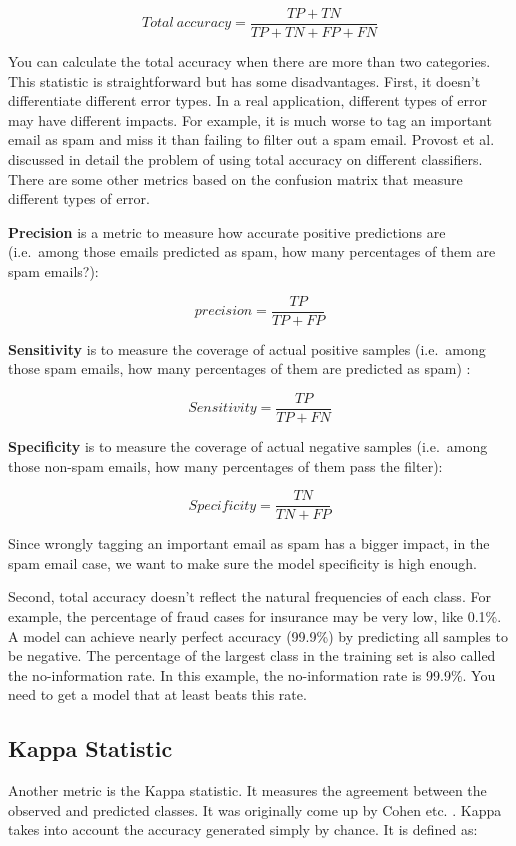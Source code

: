 \documentclass[12pt,]{krantz}
\begin{document}
\[Total\ accuracy = \frac{TP+TN}{TP+TN+FP+FN}\]

You can calculate the total accuracy when there are more than two categories. This statistic is straightforward but has some disadvantages. First, it doesn't differentiate different error types. In a real application, different types of error may have different impacts. For example, it is much worse to tag an important email as spam and miss it than failing to filter out a spam email. Provost et al. \citep{Provost1998} discussed in detail the problem of using total accuracy on different classifiers. There are some other metrics based on the confusion matrix that measure different types of error.

\textbf{Precision} is a metric to measure how accurate positive predictions are (i.e.~among those emails predicted as spam, how many percentages of them are spam emails?):

\[precision = \frac{TP}{TP+FP}\]

\textbf{Sensitivity} is to measure the coverage of actual positive samples (i.e.~among those spam emails, how many percentages of them are predicted as spam) :

\[Sensitivity = \frac{TP}{TP+FN}\]

\textbf{Specificity} is to measure the coverage of actual negative samples (i.e.~among those non-spam emails, how many percentages of them pass the filter):

\[Specificity = \frac{TN}{TN+FP}\]

Since wrongly tagging an important email as spam has a bigger impact, in the spam email case, we want to make sure the model specificity is high enough.

Second, total accuracy doesn't reflect the natural frequencies of each class. For example, the percentage of fraud cases for insurance may be very low, like 0.1\%. A model can achieve nearly perfect accuracy (99.9\%) by predicting all samples to be negative. The percentage of the largest class in the training set is also called the no-information rate. In this example, the no-information rate is 99.9\%. You need to get a model that at least beats this rate.

\hypertarget{kappa-statistic}{%
\subsection{Kappa Statistic}\label{kappa-statistic}}

Another metric is the Kappa statistic. It measures the agreement between the observed and predicted classes. It was originally come up by Cohen etc. \citep{Cohen1960}. Kappa takes into account the accuracy generated simply by chance. It is defined as:
\end{document}
